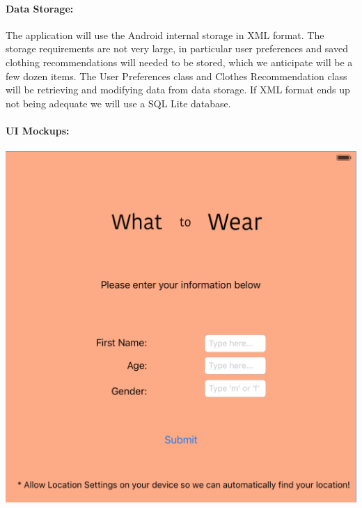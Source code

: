 \documentclass[12pt,a4paper]{article}
\begin{document}
\paragraph{Data Storage:} The application will use the Android internal storage in XML format.
The storage requirements are not very large, in particular user preferences and saved clothing recommendations
will needed to be stored, which we anticipate will be a few dozen items.
The User Preferences class and Clothes Recommendation class will be retrieving and modifying data from data storage.
If XML format ends up not being adequate we will use a SQL Lite database.
\\\\
\noindent\textbf{UI Mockups:} \\\\
\includegraphics[scale=0.4]{Login.png}\\\\
\end{document}
